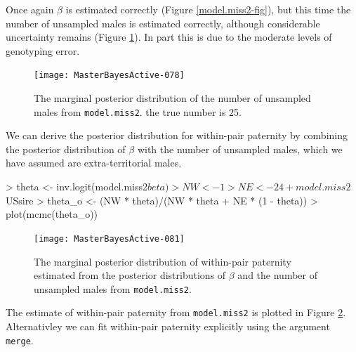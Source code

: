 \documentclass{article}
\begin{document}
Once again $\beta$ is estimated correctly (Figure \ref{model.miss2-fig}), but this time the number of unsampled males is estimated correctly, although considerable uncertainty remains (Figure \ref{model.miss2US-fig}).  In part this is due to the moderate levels of genotyping error.\\


\begin{figure}[!h]
\begin{center}
\texttt{[image: MasterBayesActive-078]}
\end{center}
\caption{The marginal posterior distribution of the number of unsampled males from \texttt{model.miss2}.  the true number is 25.}
\label{model.miss2US-fig}
\end{figure}

We can derive the posterior distribution for within-pair paternity by combining the posterior distribution of $\beta$ with the number of unsampled males, which we have assumed are extra-territorial males.

\begin{Schunk}
\begin{Sinput}
> theta <- inv.logit(model.miss2$beta)
> NW <- 1
> NE <- 24 + model.miss2$USsire
> theta_o <- (NW * theta)/(NW * theta + NE * (1 - theta))
> plot(mcmc(theta_o))
\end{Sinput}
\end{Schunk}


\begin{figure}[!h]
\begin{center}
\texttt{[image: MasterBayesActive-081]}
\end{center}
\caption{The marginal posterior distribution of within-pair paternity estimated from the posterior distributions of $\beta$ and the number of unsampled males from \texttt{model.miss2}.}
\label{EPP2Test-fig}
\end{figure}

The estimate of within-pair paternity from \texttt{model.miss2} is plotted in Figure \ref{EPP2Test-fig}.  Alternativley we can fit within-pair paternity explicitly using the argument \texttt{merge}. 

\begin{Schunk}
\end{Schunk}
\end{document}
